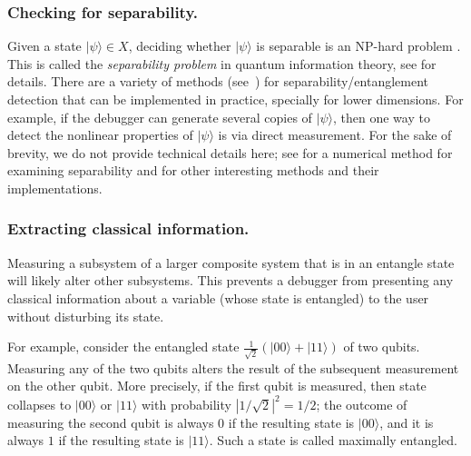 \documentclass[11pt]{article}
\theoremstyle{plain}
\theoremstyle{definition}
\newcommand{\ldbrac}[1]{\lvert#1\rangle}
\begin{document}
\subsubsection{Checking for separability.}\label{sec:separability}
Given a state $\ldbrac{\psi} \in X$, deciding whether $\ldbrac{\psi}$ is separable is an NP-hard 
problem \cite{gharibian2010strong, gurvits2003classical}. This is called the \textit{separability 
problem} in quantum information theory, see \cite[Chapter 6]{watrous2018theory} for details. There 
are a variety of methods (see~\cite{leinaas2006geometrical,guhne2009entanglement}) for 
separability/entanglement detection 
that can be implemented in practice, specially for lower dimensions. For example, if the debugger 
can generate 
several copies of $\ldbrac{\psi}$, then one way to detect the nonlinear properties of 
$\ldbrac{\psi}$ is via direct measurement. For the sake of brevity, we do not provide technical 
details here; see \cite{leinaas2006geometrical} for a numerical method 
for examining separability and \cite{guhne2009entanglement} for other interesting methods and their 
implementations.

\subsubsection{Extracting classical information.}\label{sec:classical}
Measuring a subsystem of a larger composite system that is in an entangle state will likely alter 
other subsystems. This prevents a debugger from presenting any classical information about a 
variable (whose state is entangled) to the user without disturbing its state. 

For example, consider the entangled state $\frac{1}{\sqrt{2}}(\ldbrac{00} + \ldbrac{11})$ of two 
qubits.
Measuring any of the two qubits alters the result of the subsequent measurement on the other qubit.
More precisely, if the first qubit is measured, then state collapses to $\ldbrac{00}$ or 
$\ldbrac{11}$ with probability $|1/\sqrt{2}|^2 =
1/2$; the outcome of measuring the second qubit is always $0$ if the resulting state is 
$\ldbrac{00}$, and it is always $1$ if the resulting state is $\ldbrac{11}$. Such a state is called 
maximally entangled. 
\end{document}
